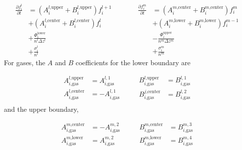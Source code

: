 \begin{equation} \label{eq:dfdt_boundary}
  \begin{aligned}
    \frac{\partial f_{i}^l}{\partial t} &= (A_{i}^{l\text{,upper}}+ B_{i}^{l\text{,upper}}) f_{i}^{l+1} \\
    &+ (A_{i}^{l\text{,center}} + B_{i}^{l\text{,center}}) f_{i}^{l} \\
    &+ \frac{\Phi_i^\text{lower}}{n^l \Delta z^l} \\
    &+ \frac{\sigma_i^l}{n^{l}}
  \end{aligned}
  \quad\quad\quad
  \begin{aligned}
    \frac{\partial f_{i}^m}{\partial t} &= (A_{i}^{m\text{,center}} + B_{i}^{m\text{,center}}) f_{i}^{m} \\
    &+ (A_{i}^{m\text{,lower}} + B_{i}^{m\text{,lower}}) f_{i}^{m-1} \\
    &- \frac{\Phi_i^\text{upper}}{n^m \Delta z^m} \\
    &+ \frac{\sigma_i^m}{n^{m}}
  \end{aligned}
  \end{equation}
For gases, the $A$ and $B$ coefficients for the lower boundary are

\begin{equation*}
  \begin{aligned}
  A_{i\text{,gas}}^{l\text{,upper}} &= A_{i\text{,gas}}^{l,1} \\
  A_{i\text{,gas}}^{l\text{,center}} &= - A_{i\text{,gas}}^{l,1} \\
  \end{aligned}
  \quad\quad
  \begin{aligned}
  B_{i\text{,gas}}^{l\text{,upper}} &= B_{i\text{,gas}}^{l,1} \\
  B_{i\text{,gas}}^{j\text{,center}} &= B_{i\text{,gas}}^{l,2} \\
  \end{aligned}
\end{equation*}
and the upper boundary,

\begin{equation*}
  \begin{aligned}
  A_{i\text{,gas}}^{m\text{,center}} &= - A_{i\text{,gas}}^{m,2} \\
  A_{i\text{,gas}}^{m\text{,lower}} &= A_{i\text{,gas}}^{m,2}
  \end{aligned}
  \quad\quad
  \begin{aligned}
  B_{i\text{,gas}}^{m\text{,center}} &= B_{i\text{,gas}}^{m,3} \\
  B_{i\text{,gas}}^{m\text{,lower}} &= B_{i\text{,gas}}^{m,4}
  \end{aligned}
\end{equation*}

